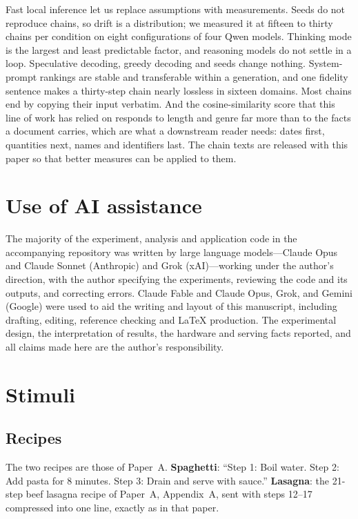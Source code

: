 \documentclass[11pt]{article}
\begin{document}
Fast local inference let us replace assumptions with measurements. Seeds do
not reproduce chains, so drift is a distribution; we measured it at fifteen
to thirty chains per condition on eight configurations of four Qwen models.
Thinking mode is the largest and least predictable factor, and reasoning
models do not settle in a loop. Speculative decoding, greedy decoding and
seeds change nothing. System-prompt rankings are stable and transferable
within a generation, and one fidelity sentence makes a thirty-step chain
nearly lossless in sixteen domains. Most chains end by copying their input
verbatim. And the cosine-similarity score that this line of work has relied
on responds to length and genre far more than to the facts a document
carries, which are what a downstream reader needs: dates first, quantities
next, names and identifiers last. The chain texts are released with this
paper so that better measures can be applied to them.

\section*{Use of AI assistance}
\label{sec:ai-disclosure}
The majority of the experiment, analysis and application code in the
accompanying repository was written by large language models---Claude Opus
and Claude Sonnet (Anthropic) and Grok (xAI)---working under the author's
direction, with the author specifying the experiments, reviewing the code
and its outputs, and correcting errors. Claude Fable and Claude Opus, Grok,
and Gemini (Google) were used to aid the writing and layout of this
manuscript, including drafting, editing, reference checking and LaTeX
production. The experimental design, the interpretation of results, the
hardware and serving facts reported, and all claims made here are the
author's responsibility.




\clearpage
\appendix

\section{Stimuli}
\label{app:prompts}

\subsection{Recipes}
The two recipes are those of Paper~A. \textbf{Spaghetti}: ``Step 1: Boil
water. Step 2: Add pasta for 8 minutes. Step 3: Drain and serve with
sauce.'' \textbf{Lasagna}: the 21-step beef lasagna recipe of Paper~A,
Appendix~A, sent with steps 12--17 compressed into one line, exactly as in
that paper.
\end{document}
